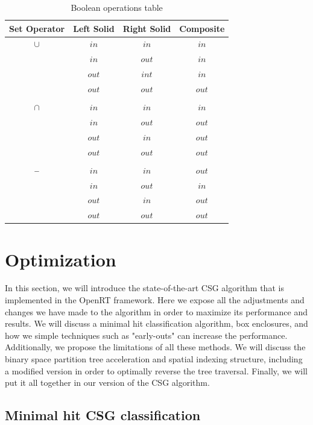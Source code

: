 \documentclass[a4paper,11pt,oneside]{article}
\newcommand{\minus}{\scalebox{0.9}[1.0]{$-$}} %
\begin{document}
\begin{table}[h]
	\centering
	\caption{Boolean operations table}
	\label{section3:boolean_algebra}
	\begin{tabular}{||c c c c||} 
		\hline
		Set Operator & Left Solid & Right Solid  & Composite \\ [0.5ex] 
		\hline\hline
		$\cup$    & $in$ & $in$ & $in$  \\
		    	  & $in$ & $out$ & $in$  \\
		    	  & $out$ & $int$ & $in$  \\
		 	   	  & $out$ & $out$ & $out$  \\
		& & & \\
		$\cap$    & $in$ & $in$ & $in$  \\
		    	  & $in$ & $out$ & $out$  \\
		    	  & $out$ & $in$ & $out$  \\
		 	   	  & $out$ & $out$ & $out$  \\
		& & & \\
		$\minus$ & $in$ & $in$ & $out$  \\
		    	  & $in$ & $out$ & $in$  \\
		    	  & $out$ & $in$ & $out$  \\
		 	   	  & $out$ & $out$ & $out$  \\		 	   	
		\hline
	\end{tabular}
\end{table}

\section{Optimization}

In this section, we will introduce the state-of-the-art CSG algorithm that is implemented in the OpenRT framework. Here we expose all the adjustments and changes we have made to the algorithm in order to maximize its performance and results. We will discuss a minimal hit classification algorithm, box enclosures, and how we simple techniques such as "early-outs" can increase the performance. Additionally, we propose the limitations of all these methods. We will discuss the binary space partition tree acceleration and spatial indexing structure, including a modified version in order to optimally reverse the tree traversal. Finally, we will put it all together in our version of the CSG algorithm.

\subsection{Minimal hit CSG classification}
\end{document}
